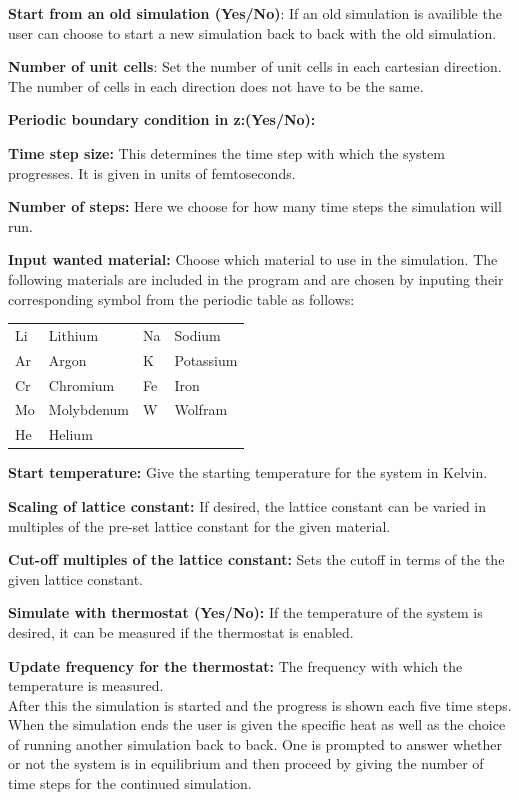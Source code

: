 \documentclass[12pt,a4paper]{article}
\begin{document}
\textbf{Start from an old simulation (Yes/No)}: If an old simulation is availible the user can choose to start a new simulation back to back with the old simulation.  

\textbf{Number of unit cells}: Set the number of unit cells in each cartesian direction. The number of cells in each direction does not have to be the same.

\textbf{Periodic boundary condition in z:(Yes/No):} 

\textbf{Time step size:} This determines the time step with which the system progresses. It is given in units of femtoseconds.

\textbf{Number of steps:} Here we choose for how many time steps the simulation will run.

\textbf{Input wanted material:} Choose which material to use in the simulation. The following materials are included in the program and are chosen by inputing their corresponding symbol from the periodic table as follows:

\begin{table}[h]
\begin{center}
\begin{tabular}{l l | l l}
Li & Lithium & Na & Sodium \\
Ar & Argon & K & Potassium \\
Cr & Chromium & Fe & Iron \\
Mo & Molybdenum & W & Wolfram \\
He & Helium & & \\
\end{tabular}
\end{center}
\end{table}


\textbf{Start temperature:} Give the starting temperature for the system in Kelvin.

\textbf{Scaling of lattice constant: }If desired, the lattice constant can be varied in multiples of the pre-set lattice constant for the given material. 

\textbf{Cut-off multiples of the lattice constant:} Sets the cutoff in terms of the the given lattice constant.

\textbf{Simulate with thermostat (Yes/No):} If the temperature of the system is desired, it can be measured if the thermostat is enabled. 

\textbf{Update frequency for the thermostat: }The frequency with which the temperature is measured. \\
After this the simulation is started and the progress is shown each five time steps. \\
When the simulation ends the user is given the specific heat as well as the choice of running another simulation back to back. One is prompted to answer whether or not the system is in equilibrium and then proceed by giving the number of time steps for the continued simulation. 
\end{document}
